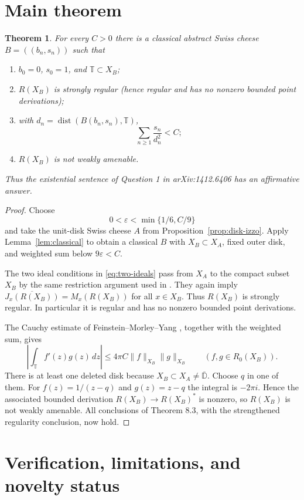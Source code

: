 \documentclass[11pt]{article}
\newtheorem{theorem}{Theorem}
\newcommand{\D}{\mathbb D}
\newcommand{\T}{\mathbb T}
\newcommand{\cl}[1]{\overline{#1}}
\begin{document}
\section{Main theorem}

\begin{theorem}\label{thm:main}
For every $C>0$ there is a classical abstract Swiss cheese
$B=((b_n,s_n))$ such that
\begin{enumerate}
\item $b_0=0$, $s_0=1$, and $\T\subset X_B$;
\item $R(X_B)$ is strongly regular (hence regular and has no nonzero bounded
point derivations);
\item with $d_n=\operatorname{dist}(B(b_n,s_n),\T)$,
\[
                 \sum_{n\geq1}\frac{s_n}{d_n^2}<C;
\]
\item $R(X_B)$ is not weakly amenable.
\end{enumerate}
Thus the existential sentence of Question 1 in arXiv:1412.6406 has an
affirmative answer.
\end{theorem}

\begin{proof}
Choose
\[
             0<\varepsilon<\min\{1/6,C/9\}
\]
and take the unit-disk Swiss cheese $A$ from
Proposition~\ref{prop:disk-izzo}.  Apply Lemma~\ref{lem:classical} to obtain a
classical $B$ with $X_B\subset X_A$, fixed outer disk, and weighted sum below
$9\varepsilon<C$.

The two ideal conditions in \eqref{eq:two-ideals} pass from $X_A$ to the
compact subset $X_B$ by the same restriction argument used in
\cite[Lemmas 5.1 and 5.2]{Izzo}.  They again imply
$\cl{J_x(R(X_B))}=M_x(R(X_B))$ for all $x\in X_B$.  Thus $R(X_B)$ is strongly
regular.  In particular it is regular and has no nonzero bounded point
derivations.

The Cauchy estimate of Feinstein--Morley--Yang
\cite[Lemma 8.2]{FMY}, together with the weighted sum, gives
\[
 \left|\int_{\T}f'(z)g(z)\,dz\right|
 \leq4\pi C\|f\|_{X_B}\|g\|_{X_B}
 \qquad(f,g\in R_0(X_B)).
\]
There is at least one deleted disk because $X_B\subset X_A\ne\cl\D$.  Choose
$q$ in one of them.  For $f(z)=1/(z-q)$ and $g(z)=z-q$ the integral is
$-2\pi i$.  Hence the associated bounded derivation
$R(X_B)\to R(X_B)^*$ is nonzero, so $R(X_B)$ is not weakly amenable.
All conclusions of Theorem 8.3, with the strengthened regularity conclusion,
now hold.
\end{proof}

\section{Verification, limitations, and novelty status}
\end{document}
